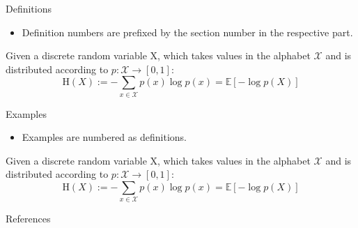 \documentclass[
11pt,notheorems,hyperref={pdfauthor=whatever}
]{beamer}
\begin{document}
\begin{frame}{}{Definitions}
    \begin{itemize}
        \item Definition numbers are prefixed by the section number in the respective part.
    \end{itemize}
     \begin{definition}
         Given a discrete random variable X, which takes values in the alphabet $\mathcal{X}$ and is distributed according to  $p:{\mathcal {X}}\to [0,1]$:
            \begin{equation}
                \mathrm {H} (X):=-\sum _{x\in {\mathcal {X}}}p(x)\log p(x)=\mathbb {E} [-\log p(X)]
            \end{equation}
    \end{definition}
\end{frame}

\begin{frame}{}{Examples}
    \begin{itemize}
        \item Examples are numbered as definitions.
    \end{itemize}
    \begin{examp}
         Given a discrete random variable X, which takes values in the alphabet $\mathcal{X}$ and is distributed according to  $p:{\mathcal {X}}\to [0,1]$:
            \begin{equation}
                \mathrm {H} (X):=-\sum _{x\in {\mathcal {X}}}p(x)\log p(x)=\mathbb {E} [-\log p(X)]
            \end{equation}
    \end{examp}
\end{frame}


\begin{frame}[allowframebreaks]{References}
    \printbibliography
\end{frame}
\end{document}
